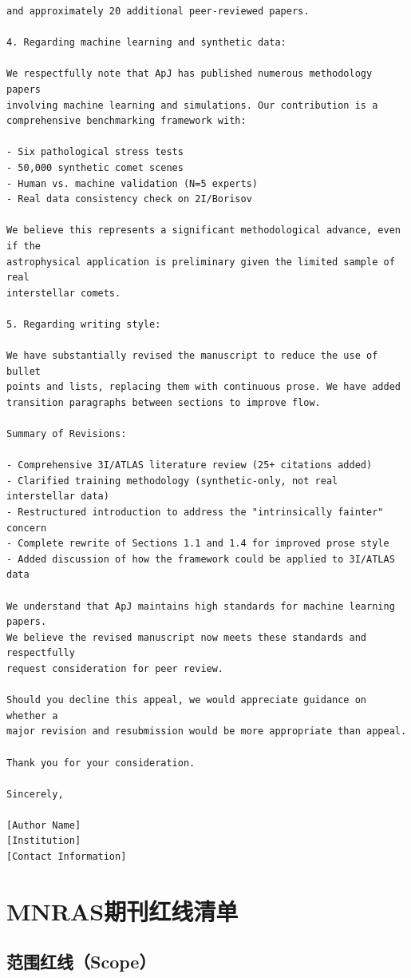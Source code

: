 \documentclass[12pt,a4paper]{article}
\begin{document}
\begin{verbatim}
and approximately 20 additional peer-reviewed papers.

4. Regarding machine learning and synthetic data:

We respectfully note that ApJ has published numerous methodology papers
involving machine learning and simulations. Our contribution is a
comprehensive benchmarking framework with:

- Six pathological stress tests
- 50,000 synthetic comet scenes
- Human vs. machine validation (N=5 experts)
- Real data consistency check on 2I/Borisov

We believe this represents a significant methodological advance, even if the
astrophysical application is preliminary given the limited sample of real
interstellar comets.

5. Regarding writing style:

We have substantially revised the manuscript to reduce the use of bullet
points and lists, replacing them with continuous prose. We have added
transition paragraphs between sections to improve flow.

Summary of Revisions:

- Comprehensive 3I/ATLAS literature review (25+ citations added)
- Clarified training methodology (synthetic-only, not real interstellar data)
- Restructured introduction to address the "intrinsically fainter" concern
- Complete rewrite of Sections 1.1 and 1.4 for improved prose style
- Added discussion of how the framework could be applied to 3I/ATLAS data

We understand that ApJ maintains high standards for machine learning papers.
We believe the revised manuscript now meets these standards and respectfully
request consideration for peer review.

Should you decline this appeal, we would appreciate guidance on whether a
major revision and resubmission would be more appropriate than appeal.

Thank you for your consideration.

Sincerely,

[Author Name]
[Institution]
[Contact Information]
\end{verbatim}

\newpage
\section{MNRAS期刊红线清单}

\subsection{范围红线（Scope）}
\end{document}
